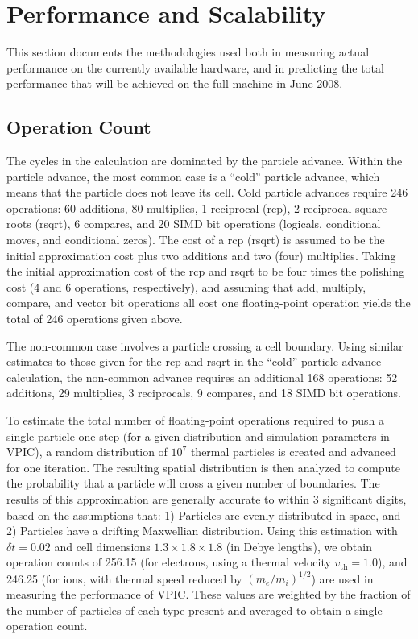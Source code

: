 \documentclass[letter,10pt]{article}
\begin{document}
\section*{Performance and Scalability} \label{sec:performance}

This section documents the methodologies used both in measuring actual performance on the currently available hardware, and in predicting the total performance that will be achieved on the full machine in June 2008.

\subsection{Operation Count}

The cycles in the calculation are dominated by the particle advance.
Within the particle advance, the most common case is a ``cold'' particle
advance, which means that the particle does not leave its cell.  Cold
particle advances require 246 operations:  60 additions, 80 multiplies, 1 
reciprocal (rcp),
2 reciprocal square roots (rsqrt), 6 compares, and 20 SIMD bit operations (logicals,
conditional moves, and conditional zeros).  The cost of a rcp 
(rsqrt) is assumed to be the initial approximation cost plus two additions and 
two (four) 
multiplies.  Taking the initial approximation cost of the rcp
and rsqrt to be four times the polishing cost (4 and 6 operations, respectively), and assuming that add, 
multiply, compare, and vector bit operations all cost one floating-point operation yields the total of 246 operations given above.

The non-common case involves a particle crossing a cell boundary.
Using similar estimates to those given for the rcp and rsqrt in the
``cold'' particle advance calculation, the non-common advance requires
an additional 168 operations: 52 additions, 29 multiplies, 3 reciprocals, 9 compares,
and 18 SIMD bit operations.

To estimate the total number of floating-point operations required to
push a single particle one step (for a given distribution and simulation
parameters in VPIC), a random distribution of $10^7$ thermal particles 
is created
and advanced for one iteration.  The resulting spatial distribution
is then analyzed to compute the probability that a particle will
cross a given number of boundaries.  The results of this approximation
are generally accurate to within 3 significant digits,
based on the assumptions that: 1) Particles are evenly distributed
in space, and 2) Particles have a drifting Maxwellian distribution.
Using this estimation with $\delta t = 0.02$ and cell
dimensions $1.3  \times 1.8 \times 1.8$ (in Debye lengths),
we obtain operation counts of 256.15 (for electrons,
using a thermal velocity $v_{\mathrm{th}} = 1.0$), and 246.25
(for ions, with thermal speed reduced by $(m_e/m_i)^{1/2}$)
are used in measuring the performance of VPIC.
These values are weighted by the fraction of the number of particles
of each type present
and averaged to obtain a single operation count.
\end{document}
